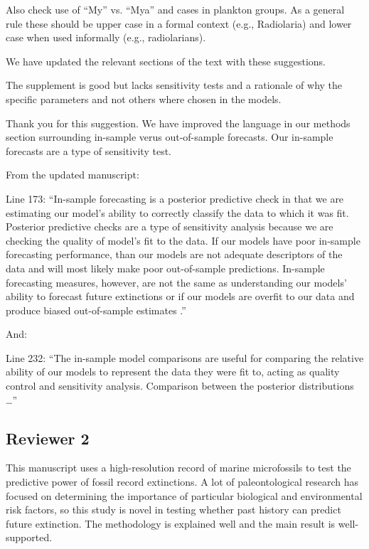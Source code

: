 \documentclass[12pt,letterpaper]{article}
\begin{document}
\begin{refsection}
\begin{bfseries}
  Also check use of “My” vs. “Mya” and cases in plankton groups. As a general rule these should be upper case in a formal context (e.g., Radiolaria) and lower case when used informally (e.g., radiolarians). 
\end{bfseries}

We have updated the relevant sections of the text with these suggestions.

\begin{bfseries}
  The supplement is good but lacks sensitivity tests and a rationale of why the specific parameters and not others where chosen in the models. 
\end{bfseries}

Thank you for this suggestion. We have improved the language in our methods section surrounding in-sample verus out-of-sample forecasts. Our in-sample forecasts are a type of sensitivity test.

From the updated manuscript:

Line 173: ``In-sample forecasting is a posterior predictive check in that we are estimating our model's ability to correctly classify the data to which it was fit. Posterior predictive checks are a type of sensitivity analysis because we are checking the quality of model's fit to the data. If our models have poor in-sample forecasting performance, than our models are not adequate descriptors of the data and will most likely make poor out-of-sample predictions. In-sample forecasting measures, however, are not the same as understanding our models' ability to forecast future extinctions or if our models are overfit to our data and produce biased out-of-sample estimates \citep{ESL}.''

And:

Line 232: ``The in-sample model comparisons are useful for comparing the relative ability of our models to represent the data they were fit to, acting as quality control and sensitivity analysis. Comparison between the posterior distributions \dots''


\subsection{Reviewer 2}

\begin{bfseries}
  This manuscript uses a high-resolution record of marine microfossils to test the predictive power of fossil record extinctions. A lot of paleontological research has focused on determining the importance of particular biological and environmental risk factors, so this study is novel in testing whether past history can predict future extinction. The methodology is explained well and the main result is well-supported.


\end{bfseries}
\end{refsection}
\end{document}
